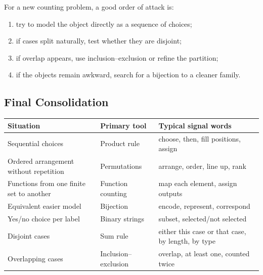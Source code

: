 \begin{examtip}[title={A practical hierarchy of methods for Handout 01}]
For a new counting problem, a good order of attack is:
\begin{enumerate}[leftmargin=*]
    \item try to model the object directly as a sequence of choices;
    \item if cases split naturally, test whether they are disjoint;
    \item if overlap appears, use inclusion--exclusion or refine the partition;
    \item if the objects remain awkward, search for a bijection to a cleaner family.
\end{enumerate}
\end{examtip}

\subsection{Final Consolidation}

\begin{center}
\small
\begin{tabular}{@{}p{}p{}p{}@{}}
\toprule
\textbf{Situation} & \textbf{Primary tool} & \textbf{Typical signal words} \\
\midrule
Sequential choices & Product rule & choose, then, fill positions, assign \\
Ordered arrangement without repetition & Permutations & arrange, order, line up, rank \\
Functions from one finite set to another & Function counting & map each element, assign outputs \\
Equivalent easier model & Bijection & encode, represent, correspond \\
Yes/no choice per label & Binary strings & subset, selected/not selected \\
Disjoint cases & Sum rule & either this case or that case, by length, by type \\
Overlapping cases & Inclusion--exclusion & overlap, at least one, counted twice \\
\bottomrule
\end{tabular}
\end{center}


